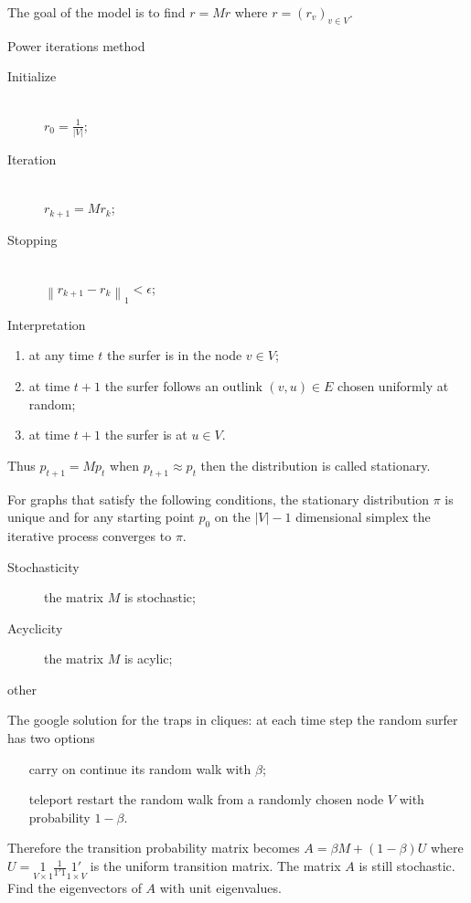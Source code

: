 \documentclass[a4paper]{article}
\newcommand{\brac}[1]{{\left ( #1 \right )}}
\newcommand{\abs}[1]{{\left | #1 \right |}}
\newcommand{\nrm}[1]{{\left\| #1 \right \|}}
\begin{document}
The goal of the model is to find $r = Mr$ where $r=\brac{r_v}_{v\in V}$.

Power iterations method \begin{description}
	\item[Initialize] \hfill\\
		$r_0=\frac{1}{\abs{V}}$;
	\item[Iteration] \hfill\\
		$r_{k+1} = M r_k$;
	\item[Stopping] \hfill\\
		$\nrm{r_{k+1}-r_k}_1 < \epsilon$;
\end{description}

Interpretation
\begin{enumerate}
	\item at any time $t$ the surfer is in the node $v\in V$;
	\item at time $t+1$ the surfer follows an outlink $(v,u)\in E$ chosen uniformly at random;
	\item at time $t+1$ the surfer is at $u\in V$.
\end{enumerate}

Thus $p_{t+1} = M p_t$ when $p_{t+1} \approx p_t$ then the distribution is called stationary.

For graphs that satisfy the following conditions, the stationary distribution $\pi$ is unique and for any starting point $p_0$ on the $\abs{V}-1$ dimensional simplex the iterative process converges to $\pi$.
\begin{description}
	\item[Stochasticity] the matrix $M$ is stochastic;
	\item[Acyclicity] the matrix $M$ is acylic;
	\item[other] 
\end{description}

The google solution for the traps in cliques: at each time step the random surfer has two options
\begin{itemize}
	\item[carry on] continue its random walk with $\beta$;
	\item[teleport] restart the random walk from a randomly chosen node $V$ with probability $1-\beta$.
\end{itemize}

Therefore the transition probability matrix becomes $A = \beta M + (1-\beta)U$ where $U = \underset{V\times 1}{1}\frac{1}{1'1}\underset{1\times V}{1'}$ is the uniform transition matrix.
The matrix $A$ is still stochastic. Find the eigenvectors of $A$ with unit eigenvalues.
\end{document}
